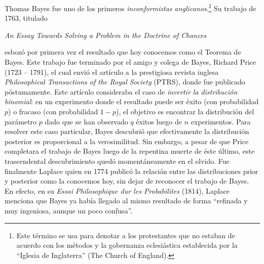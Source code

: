 \begin{mdframed}[style=discusion, frametitle={\center ¿Qué hizo efectivamente Bayes y por qué?}]

Thomas Bayes fue uno de los primeros \emph{inconformistas anglicanos}.\footnote{ Este término se usa para denotar a los protestantes que no estaban de acuerdo con los métodos y la gobernanza eclesiástica establecida por la ``Iglesia de Inglaterra'' (The Church of England).} Su trabajo de 1763, titulado 
\begin{center}
\it
An Essay Towards Solving a Problem in the Doctrine of Chances
\end{center}
esbozó por primera vez el resultado que hoy conocemos como el Teorema de Bayes. Este trabajo fue terminado por el amigo y colega de Bayes, Richard Price (1723 – 1791), el cual  envió el artículo a la prestigiosa revista inglesa \emph{Philosophical Transactions of the Royal Society} (PTRS), donde fue publicado póstumamente. Este artículo consideraba el caso de \emph{invertir la distribución binomial}: en un experimento donde el resultado puede ser éxito  (con probabilidad $p$) o fracaso (con probabilidad $1-p$), el objetivo es encontrar la distribución del parámetro $p$ dado que se han observado $q$ éxitos luego de $n$ experimentos. Para resolver este caso particular, Bayes descubrió que efectivamente la distribución posterior es proporcional a la verosimilitud. Sin embargo, a pesar de que Price completara el trabajo de Bayes  luego de la repentina muerte de éste último, este trascendental descubrimiento quedó momentáneamente en el olvido. Fue finalmente Laplace quien en 1774 publicó la relación entre las distribuciones  prior y posterior como la conocemos hoy, sin dejar de reconocer el trabajo de Bayes. En efecto, en su \emph{Essai Philosophique dur les Probabilites} (1814), Laplace menciona que Bayes ya había llegado al mismo resultado de forma ``refinada y muy ingeniosa, aunque un poco confusa''. 



\end{mdframed}
